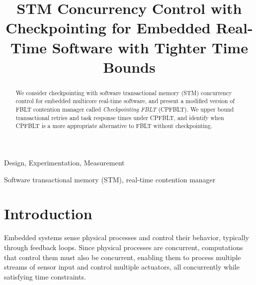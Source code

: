 \documentclass[preprint]{sigplanconf}
\begin{document}
\copyrightdata{[to be supplied]} 


\title{STM Concurrency Control with Checkpointing for Embedded Real-Time Software with Tighter Time Bounds}
\authorinfo{}
           {}
           {}
\authorinfo{}
           {}
           {}
          
\begin{comment}
\authorinfo{Mohammed Elshambakey}
           {ECE Dept., Virginia Tech, Blacksburg, VA 24060, USA}
           {shambake@vt.edu}
\authorinfo{Binoy Ravindran}
           {ECE Dept., Virginia Tech, Blacksburg, VA 24060, USA}
           {binoy@vt.edu}
\end{comment}                     


\maketitle

\begin{abstract}
We consider checkpointing with software transactional memory (STM) concurrency control for embedded multicore real-time software, and present a modified version of FBLT contention manager called \textit{Checkpointing FBLT} (CPFBLT). We upper bound transactional retries and task response times under CPFBLT, and identify when CPFBLT is a more appropriate alternative to FBLT without checkpointing.
\end{abstract}


\terms
Design, Experimentation, Measurement

\keywords
Software transactional memory (STM), real-time contention manager

\section{Introduction}

\label{sec:intro}

Embedded systems sense physical processes and control their behavior, typically through feedback loops. Since physical processes are concurrent, computations that control them must also be concurrent, enabling them to process multiple streams of sensor input and control multiple actuators, all concurrently while satisfying time constraints. 
\end{document}
